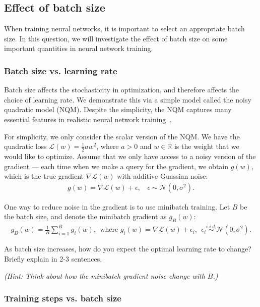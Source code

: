 \subsection{Effect of batch size}
When training neural networks, it is important to select an appropriate batch size. In this question, we will investigate the effect of batch size on some important quantities in neural network training.

\subsubsection{Batch size vs. learning rate}
Batch size affects the stochasticity in optimization, and therefore affects the choice of learning rate. We demonstrate this via a simple model called the noisy quadratic model (NQM). Despite the simplicity, the NQM captures many essential features in realistic neural network training~\cite{zhang2019algorithmic}. 

For simplicity, we only consider the scalar version of the NQM. We have the quadratic loss $\mathcal{L}(w) = \frac{1}{2} a w^2$, where $a > 0$ and $w \in \mathbb{R}$ is the weight that we would like to optimize. Assume that we only have access to a noisy version of the gradient --- each time when we make a query for the gradient, we obtain $g(w)$, which is the true gradient $\nabla \mathcal{L}(w)$ with additive Guassian noise:
\begin{align*}
    g (w) = \nabla \mathcal{L}(w) + \epsilon,~~~~\epsilon \sim \mathcal{N}(0, \sigma^2).
\end{align*}

One way to reduce noise in the gradient is to use minibatch training. Let $B$ be the batch size, and denote the minibatch gradient as $g_B(w)$:
\begin{align*}
    g_B(w) = \frac{1}{B} \sum_{i=1}^B g_i(w),~~\text{where } g_i(w) = \nabla \mathcal{L}(w) + \epsilon_i,~~\epsilon_i \stackrel{i.i.d.}{\sim} \mathcal{N}(0, \sigma^2).
\end{align*}

\item[(a) {\color{blue} [1pt]}] As batch size increases, how do you expect the optimal learning rate to change? Briefly explain in 2-3 sentences.
    
    {\it (Hint: Think about how the minibatch gradient noise change with $B$.)}

\subsubsection{Training steps vs. batch size}\label{sec:training_steps_vs_bs}

